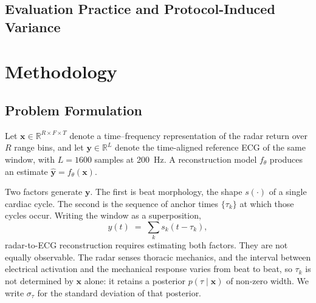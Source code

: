 \documentclass[lettersize,journal]{IEEEtran}
\begin{document}
\subsection{Evaluation Practice and Protocol-Induced Variance}
\label{sec:evalpractice}

\section{Methodology}
\label{sec:method}

\subsection{Problem Formulation}
\label{sec:formulation}
Let $\mathbf{x} \in \mathbb{R}^{R \times F \times T}$ denote a time--frequency representation of the radar return over $R$ range bins, and let $\mathbf{y} \in \mathbb{R}^{L}$ denote the time-aligned reference ECG of the same window, with $L = 1600$ samples at \SI{200}{\hertz}. A reconstruction model $f_\theta$ produces an estimate $\hat{\mathbf{y}} = f_\theta(\mathbf{x})$.

Two factors generate $\mathbf{y}$. The first is beat morphology, the shape $s(\cdot)$ of a single cardiac cycle. The second is the sequence of anchor times $\{\tau_k\}$ at which those cycles occur. Writing the window as a superposition,
\begin{equation}
  y(t) \;=\; \sum_{k} s_k(t - \tau_k),
  \label{eq:generative}
\end{equation}
radar-to-ECG reconstruction requires estimating both factors. They are not equally observable. The radar senses thoracic mechanics, and the interval between electrical activation and the mechanical response varies from beat to beat, so $\tau_k$ is not determined by $\mathbf{x}$ alone: it retains a posterior $p(\tau \mid \mathbf{x})$ of non-zero width. We write $\sigma_\tau$ for the standard deviation of that posterior.
\end{document}
